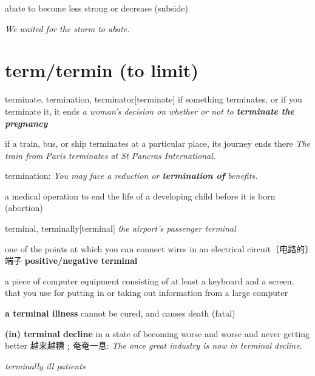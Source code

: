 \begin{DefWord}{abate}
    to become less strong or decrease (subside)

    \textit{We waited for the storm to abate.}
\end{DefWord}

\section{term/termin (to limit)}

\begin{DefWord}{terminate, termination, terminator}[terminate]
    if something terminates, or if you terminate it, it ends
    \textit{a woman’s decision on whether or not to \textbf{terminate the pregnancy}}

    if a train, bus, or ship terminates at a particular place, its journey ends there
    \textit{The train from Paris terminates at St Pancras International.}

    termination:
    \textit{You may face a reduction or \textbf{termination of} benefits.}

    a medical operation to end the life of a developing child before it is born (abortion)
\end{DefWord}

\begin{DefWord}{terminal, terminally}[terminal]
    \textit{the airport’s passenger terminal}

    one of the points at which you can connect wires in an electrical circuit〔电路的〕端子
\textbf{positive/negative terminal}

a piece of computer equipment consisting of at least a keyboard and a screen, that you use for putting in or taking out information from a large computer

\textbf{a terminal illness} cannot be cured, and causes death (fatal)

\textbf{(in) terminal decline} in a state of becoming worse and worse and never getting better 越来越糟﹔奄奄一息:
 \textit{The once great industry is now in terminal decline.}

 \textit{terminally ill patients}
\end{DefWord}

